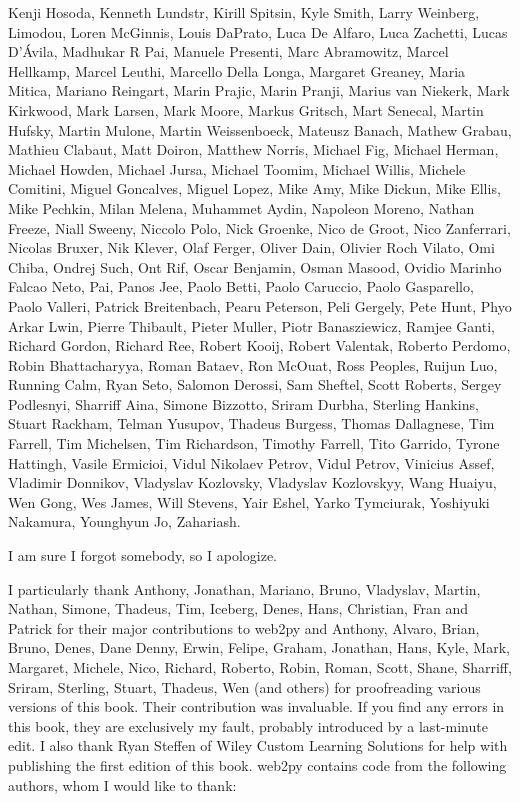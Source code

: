 \documentclass[justified,sixbynine,notoc]{tufte-book}
\begin{document}
\begin{fullwidth}
Kenji Hosoda,
Kenneth Lundstr,
Kirill Spitsin,
Kyle Smith,
Larry Weinberg,
Limodou,
Loren McGinnis,
Louis DaPrato,
Luca De Alfaro,
Luca Zachetti,
Lucas D'Ávila,
Madhukar R Pai,
Manuele Presenti,
Marc Abramowitz,
Marcel Hellkamp,
Marcel Leuthi,
Marcello Della Longa,
Margaret Greaney,
Maria Mitica,
Mariano Reingart,
Marin Prajic,
Marin Pranji,
Marius van Niekerk,
Mark Kirkwood,
Mark Larsen,
Mark Moore,
Markus Gritsch,
Mart Senecal,
Martin Hufsky,
Martin Mulone,
Martin Weissenboeck,
Mateusz Banach,
Mathew Grabau,
Mathieu Clabaut,
Matt Doiron,
Matthew Norris,
Michael Fig,
Michael Herman,
Michael Howden,
Michael Jursa,
Michael Toomim,
Michael Willis,
Michele Comitini,
Miguel Goncalves,
Miguel Lopez,
Mike Amy,
Mike Dickun,
Mike Ellis,
Mike Pechkin,
Milan Melena,
Muhammet Aydin,
Napoleon Moreno,
Nathan Freeze,
Niall Sweeny,
Niccolo Polo,
Nick Groenke,
Nico de Groot,
Nico Zanferrari,
Nicolas Bruxer,
Nik Klever,
Olaf Ferger,
Oliver Dain,
Olivier Roch Vilato,
Omi Chiba,
Ondrej Such,
Ont Rif,
Oscar Benjamin,
Osman Masood,
Ovidio Marinho Falcao Neto,
Pai,
Panos Jee,
Paolo Betti,
Paolo Caruccio,
Paolo Gasparello,
Paolo Valleri,
Patrick Breitenbach,
Pearu Peterson,
Peli Gergely,
Pete Hunt,
Phyo Arkar Lwin,
Pierre Thibault,
Pieter Muller,
Piotr Banasziewicz,
Ramjee Ganti,
Richard Gordon,
Richard Ree,
Robert Kooij,
Robert Valentak,
Roberto	Perdomo,
Robin Bhattacharyya,
Roman Bataev,
Ron McOuat,
Ross Peoples,
Ruijun Luo,
Running Calm,
Ryan Seto,
Salomon Derossi,
Sam Sheftel,
Scott Roberts,
Sergey Podlesnyi,
Sharriff Aina,
Simone Bizzotto,
Sriram Durbha,
Sterling Hankins,
Stuart Rackham,
Telman Yusupov,
Thadeus Burgess,
Thomas Dallagnese,
Tim Farrell,
Tim Michelsen,
Tim Richardson,
Timothy Farrell,
Tito Garrido,
Tyrone Hattingh,
Vasile Ermicioi,
Vidul Nikolaev Petrov,
Vidul Petrov,
Vinicius Assef,
Vladimir Donnikov,
Vladyslav Kozlovsky,
Vladyslav Kozlovskyy,
Wang Huaiyu,
Wen Gong,
Wes James,
Will Stevens,
Yair Eshel,
Yarko Tymciurak,
Yoshiyuki Nakamura,
Younghyun Jo,
Zahariash.

I am sure I forgot somebody, so I apologize.

I particularly thank Anthony, Jonathan, Mariano, Bruno, Vladyslav, Martin, Nathan, Simone, Thadeus, Tim, Iceberg, Denes, Hans, Christian, Fran and Patrick for their major contributions to web2py and Anthony, Alvaro, Brian, Bruno, Denes, Dane Denny, Erwin, Felipe, Graham, Jonathan, Hans, Kyle, Mark, Margaret, Michele, Nico, Richard, Roberto, Robin, Roman, Scott, Shane, Sharriff, Sriram, Sterling, Stuart, Thadeus, Wen (and others) for proofreading various versions of this book. Their contribution was invaluable. If you find any errors in this book, they are exclusively my fault, probably introduced by a last-minute edit. I also thank Ryan Steffen of Wiley Custom Learning Solutions for help with publishing the first edition of this book.
\noindent web2py contains code from the following authors, whom I would like to thank:


\end{fullwidth}
\end{document}
